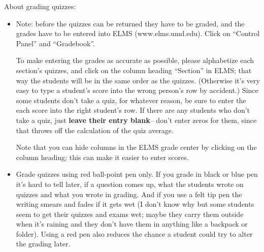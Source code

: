 \documentclass[12pt]{article}
\begin{document}
      \begin{itemize*}
  
        \addtolength{\itemsep}{2mm}
  
        \item About grading quizzes:

              \vspace{-1.5mm}

              \begin{itemize}

                \addtolength{\itemsep}{.75mm}

                \item Note: before the quizzes can be returned they have to
                      be graded, and the grades have to be entered into ELMS
                      (www.elms.umd.edu).  Click on ``Control Panel'' and
                      ``Gradebook''.
  
                      To make entering the grades as accurate as
                      possible, please alphabetize each section's quizzes,
                      and click on the column heading ``Section'' in ELMS;
                      that way the students will be in the same order as the
                      quizzes.  (Otherwise it's very easy to type a student's
                      score into the wrong person's row by accident.)  Since
                      some students don't take a quiz, for whatever reason, be
                      sure to enter the each score into the right student's
                      row.  If there are any students who don't take a quiz,
                      just \textbf{leave their entry blank}-- don't enter
                      zeros for them, since that throws off the calculation of
                      the quiz average.
  
                      Note that you can hide columns in the ELMS grade center
                      by clicking on the column heading; this can make it
                      easier to enter scores.

                \item Grade quizzes using red ball-point pen only.  If you
                      grade in black or blue pen it's hard to tell later, if
                      a question comes up, what the students wrote on
                      quizzes and what you wrote in grading.  And if you use
                      a felt tip pen the writing smears and fades if it gets
                      wet (I don't know why but some students seem to get
                      their quizzes and exams wet; maybe they carry them
                      outside when it's raining and they don't have them in
                      anything like a backpack or folder).  Using a red pen
                      also reduces the chance a student could try to alter
                      the grading later.


\end{itemize}
\end{itemize*}
\end{document}

